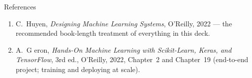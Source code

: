 \begin{frame}[allowframebreaks]{References}
\begin{enumerate}
    \item C.~Huyen, \textit{Designing Machine Learning Systems}, O'Reilly, 2022 --- the recommended
          book-length treatment of everything in this deck.
    \item A.~G eron, \textit{Hands-On Machine Learning with Scikit-Learn, Keras, and TensorFlow},
          3rd ed., O'Reilly, 2022, Chapter~2 and Chapter~19 (end-to-end project; training and deploying at
          scale).
  \end{enumerate}
\end{frame}
